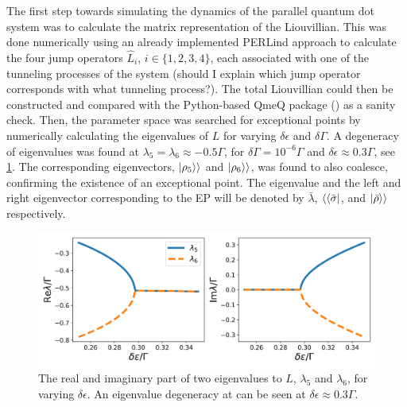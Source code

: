 \documentclass[../main.tex]{subfiles}
\begin{document}
The first step towards simulating the dynamics of the parallel quantum dot system was to calculate the matrix representation of the Liouvillian. This was done numerically using an already implemented PERLind approach to calculate the four jump operators $\hat L_i$, $i\in\{1,2,3,4\}$, each associated with one of the tunneling processes of the system (should I explain which jump operator corresponds with what tunneling process?). The total Liouvillian could then be constructed and compared with the Python-based QmeQ package (\cite{qmeq}) as a sanity check. Then, the parameter space was searched for exceptional points by numerically calculating the eigenvalues of $L$ for varying $\delta\epsilon$ and $\delta\Gamma$. A degeneracy of eigenvalues was found at $\lambda_5 = \lambda_6\approx -0.5\Gamma$, for $\delta\Gamma = 10^{-6}\Gamma$ and $\delta\epsilon \approx 0.3\Gamma$, see \cref{fig:tuning}. The corresponding eigenvectors, $\ket{\rho_5}\rangle$ and $\ket{\rho_6}\rangle$, was found to also coalesce, confirming the existence of an exceptional point. The eigenvalue and the left and right eigenvector corresponding to the EP will be denoted by $\bar \lambda$, $\langle\bra{\bar\sigma}$, and $\ket{\bar\rho}\rangle$ respectively.
\begin{figure}[H]
    \centering
    \includegraphics[width=0.9\linewidth]{figures/tuning.png}
    \caption{The real and imaginary part of two eigenvalues to $L$, $\lambda_5$ and $\lambda_6$, for varying $\delta\epsilon$. An eigenvalue degeneracy at can be seen at $\delta\epsilon\approx0.3\Gamma$.}
    \label{fig:tuning}
\end{figure}
\end{document}
